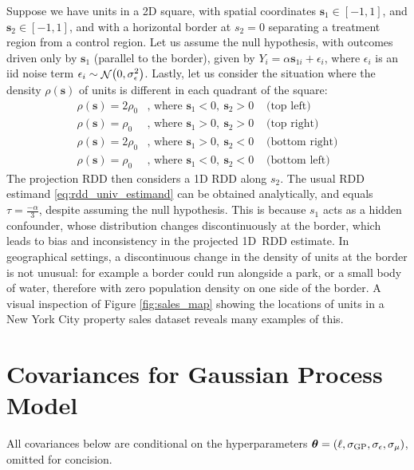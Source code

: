 \documentclass[letter,12pt]{article}
\DeclarePairedDelimiter{\parenthesis}{\lparen}{\rparen}
\newcommand{\del}[1]{\parenthesis*{#1}}
\DeclareMathOperator{\normal}{\mathcal{N}}
\newcommand{\sigmaf}{\sigma_{\mathrm{GP}}}
\newcommand{\sigman}{\sigma_{\epsilon}}
\newcommand{\sigmamu}{\sigma_{\mu}}
\newcommand{\svec}{\mathbold{s}}
\newcommand{\hyperparam}{\bm{\theta}}
\begin{document}
Suppose we have units in a 2D square, with spatial coordinates \(\svec_1 \in [-1,1]\), and \(\svec_2 \in [-1,1]\), and with a horizontal border at \(s_2=0\) separating a treatment region from a control region.
Let us assume the null hypothesis, with outcomes driven only by \(\svec_1\) (parallel to the border), given by \(Y_{i} = \alpha \svec_{1i} + \epsilon_i\),
where \(\epsilon_i\) is an iid noise term \(\epsilon_i \sim \normal\del{0, \sigman^2}\).
Lastly, let us consider the situation where the density \(\rho(\svec)\) of units is different in each quadrant of the square:
\begin{equation}
    \begin{aligned}
        \rho(\svec) = 2\rho_0 & \text{, where }\svec_1 < 0,~\svec_2 > 0 & \text{ (top left)} \\
        \rho(\svec) = \rho_0 & \text{, where }\svec_1 > 0,~\svec_2 > 0 & \text{ (top right)} \\
        \rho(\svec) = 2\rho_0 & \text{, where }\svec_1 > 0,~\svec_2 < 0 & \text{ (bottom right)}  \\
        \rho(\svec) = \rho_0 & \text{, where }\svec_1 < 0,~\svec_2 < 0 & \text{ (bottom left)}
    \end{aligned}
\end{equation}
The projection RDD then considers a 1D RDD along \(s_2\).
The usual RDD estimand \eqref{eq:rdd_univ_estimand} can be obtained analytically, and equals \(\tau=\frac{-\alpha}{3}\), despite assuming the null hypothesis.
This is because \(s_1\) acts as a hidden confounder, whose distribution changes discontinuously at the border, which leads to bias and inconsistency in the projected 1D~RDD estimate.
In geographical settings, a discontinuous change in the density of units at the border is not unusual: for example a border could run alongside a park, or a small body of water, therefore with zero population density on one side of the border.
A visual inspection of Figure \ref{fig:sales_map} showing the locations of units in a New York City property sales dataset reveals many examples of this.



\hypertarget{covariances-for-gaussian-process-model}{%
\section{Covariances for Gaussian Process Model}\label{covariances-for-gaussian-process-model}}


\label{sec:covariances}
All covariances below are conditional on the hyperparameters \(\hyperparam = \del{\ell,\sigmaf, \sigman, \sigmamu}\), omitted for concision.
\end{document}
